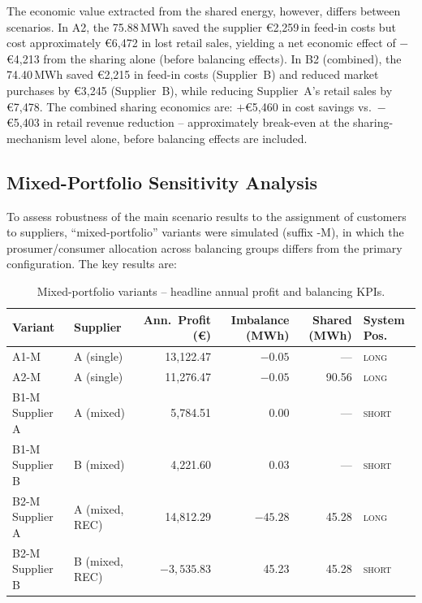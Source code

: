The economic value extracted from the shared energy, however, differs between
scenarios.  In A2, the 75.88\,MWh saved the supplier €2{,}259\,in feed-in
costs but cost approximately €6,472 in lost retail sales, yielding a net
economic effect of $-$€4,213 from the sharing alone (before balancing effects).
In B2 (combined), the 74.40\,MWh saved €2,215 in feed-in costs (Supplier~B)
and reduced market purchases by €3{,}245 (Supplier~B), while reducing
Supplier~A's retail sales by €7{,}478.  The combined sharing economics are:
$+$€5{,}460 in cost savings vs.\ $-$€5{,}403 in retail revenue reduction --
approximately break-even at the sharing-mechanism level alone, before balancing
effects are included.

\subsection{Mixed-Portfolio Sensitivity Analysis}

To assess robustness of the main scenario results to the assignment of customers
to suppliers, ``mixed-portfolio'' variants were simulated (suffix -M), in which
the prosumer/consumer allocation across balancing groups differs from the primary
configuration.  The key results are:

\begin{table}[htbp]
\centering
\caption{Mixed-portfolio variants -- headline annual profit and balancing KPIs.}
\label{tab:mixed_variants}
\renewcommand{\arraystretch}{1.35}
\begin{tabular}{@{}llrrrl@{}}
\toprule
\textbf{Variant}  & \textbf{Supplier}  & \textbf{Ann.\ Profit (€)}
                  & \textbf{Imbalance (MWh)} & \textbf{Shared (MWh)}
                  & \textbf{System Pos.} \\
\midrule
A1-M              & A (single)          & 13{,}122.47 & $-0.05$  & ---   & \textsc{long}  \\
A2-M              & A (single)          & 11{,}276.47 & $-0.05$  & 90.56 & \textsc{long}  \\
B1-M Supplier A   & A (mixed)           & 5{,}784.51  & 0.00     & ---   & \textsc{short} \\
B1-M Supplier B   & B (mixed)           & 4{,}221.60  & 0.03     & ---   & \textsc{short} \\
B2-M Supplier A   & A (mixed, REC)      & 14{,}812.29 & $-45.28$ & 45.28 & \textsc{long}  \\
B2-M Supplier B   & B (mixed, REC)      & $-3{,}535.83$ & 45.23  & 45.28 & \textsc{short} \\
\bottomrule
\end{tabular}
\end{table}

